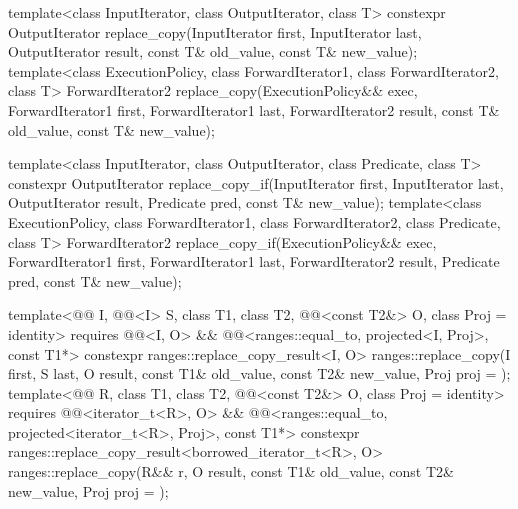 %
%
\begin{itemdecl}
template<class InputIterator, class OutputIterator, class T>
  constexpr OutputIterator
    replace_copy(InputIterator first, InputIterator last,
                 OutputIterator result,
                 const T& old_value, const T& new_value);
template<class ExecutionPolicy, class ForwardIterator1, class ForwardIterator2, class T>
  ForwardIterator2
    replace_copy(ExecutionPolicy&& exec,
                 ForwardIterator1 first, ForwardIterator1 last,
                 ForwardIterator2 result,
                 const T& old_value, const T& new_value);

template<class InputIterator, class OutputIterator, class Predicate, class T>
  constexpr OutputIterator
    replace_copy_if(InputIterator first, InputIterator last,
                    OutputIterator result,
                    Predicate pred, const T& new_value);
template<class ExecutionPolicy, class ForwardIterator1, class ForwardIterator2,
         class Predicate, class T>
  ForwardIterator2
    replace_copy_if(ExecutionPolicy&& exec,
                    ForwardIterator1 first, ForwardIterator1 last,
                    ForwardIterator2 result,
                    Predicate pred, const T& new_value);

template<@@ I, @@<I> S, class T1, class T2, @@<const T2&> O,
         class Proj = identity>
  requires @@<I, O> &&
           @@<ranges::equal_to, projected<I, Proj>, const T1*>
  constexpr ranges::replace_copy_result<I, O>
    ranges::replace_copy(I first, S last, O result, const T1& old_value, const T2& new_value,
                         Proj proj = {});
template<@@ R, class T1, class T2, @@<const T2&> O,
         class Proj = identity>
  requires @@<iterator_t<R>, O> &&
           @@<ranges::equal_to, projected<iterator_t<R>, Proj>, const T1*>
  constexpr ranges::replace_copy_result<borrowed_iterator_t<R>, O>
    ranges::replace_copy(R&& r, O result, const T1& old_value, const T2& new_value,
                         Proj proj = {});


\end{itemdecl}
